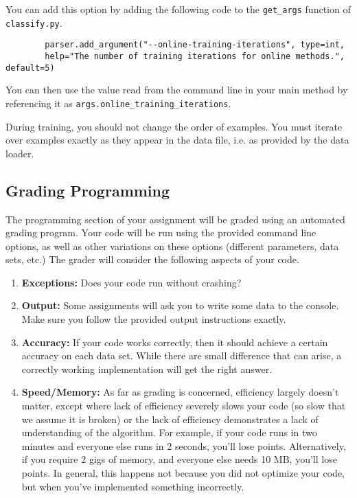\documentclass[11pt]{article}
\newcommand{\code}[1]{{\footnotesize \tt #1}}
\begin{document}
	You can add this option by adding the following code to the \code{get\_args} function of \code{classify.py}.
	\begin{footnotesize}
		\begin{verbatim}
		parser.add_argument("--online-training-iterations", type=int,
		help="The number of training iterations for online methods.", default=5)
		\end{verbatim}
	\end{footnotesize}
	
	You can then use the value read from the command line in your main method by referencing it as \code{args.online\_training\_iterations}. 
	
	During training, you should not change the order of examples. You must iterate over examples exactly as they appear in the data file, i.e. as provided by the data loader.
	
	\subsection{Grading Programming}
	The programming section of your assignment will be graded using an automated grading program. Your code will be run using
	the provided command line options, as well as other variations on these options (different parameters, data sets, etc.) The grader will consider the following aspects of your code.
	\begin{enumerate}
		\item {\bf Exceptions:} Does your code run without crashing?
		\item {\bf Output:} Some assignments will ask you to write some data to the console. Make sure you follow the provided output instructions exactly.
		\item {\bf Accuracy:} If your code works correctly, then it should achieve a certain accuracy on each data set. While there are small difference that can arise, a correctly working implementation will get the right answer.
		\item {\bf Speed/Memory:} As far as grading is concerned, efficiency largely doesn't matter, except where lack of efficiency severely slows your code (so slow that we assume it is broken) or the lack of efficiency demonstrates a lack of understanding of the algorithm.  For example, if your code runs in two minutes and everyone else runs in 2 seconds, you'll lose points. Alternatively, if you require 2 gigs of memory, and everyone else needs 10 MB, you'll lose points. In general, this happens not because you did not optimize your code, but when you've implemented something incorrectly.
	\end{enumerate}
	
\end{document}
